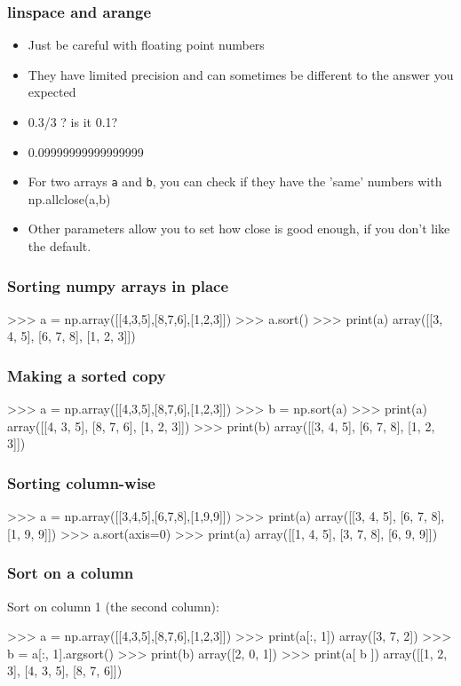 \documentclass{beamer}
\begin{document}
\begin{frame}[fragile]
\frametitle{linspace and arange}
\begin{itemize}
\item Just be careful with floating point numbers
\item They have limited precision and can sometimes be different to
  the answer you expected
\item 0.3/3 ? is it 0.1?
\item 0.09999999999999999
\item For two arrays \texttt{a} and \texttt{b}, you can check if they have the 'same'
  numbers with np.allclose(a,b)
\item Other parameters allow you to set how close is good enough, if
  you don't like the default.
\end{itemize}
\end{frame}


\begin{frame}[fragile]
\frametitle{Sorting numpy arrays in place}
\begin{code}
>>> a = np.array([[4,3,5],[8,7,6],[1,2,3]]) 
>>> a.sort()
>>> print(a)
array([[3, 4, 5],
       [6, 7, 8],
       [1, 2, 3]])
\end{code}
\end{frame}

\begin{frame}[fragile]
\frametitle{Making a sorted copy}
\begin{code}
>>> a = np.array([[4,3,5],[8,7,6],[1,2,3]])
>>> b = np.sort(a)
>>> print(a)
array([[4, 3, 5],
       [8, 7, 6],
       [1, 2, 3]])
>>> print(b)
array([[3, 4, 5],
       [6, 7, 8],
       [1, 2, 3]])
\end{code}
\end{frame}

\begin{frame}[fragile]
\frametitle{{Sorting column-wise}}
\begin{code}
>>> a = np.array([[3,4,5],[6,7,8],[1,9,9]])
>>> print(a)
array([[3, 4, 5],
       [6, 7, 8],
       [1, 9, 9]])
>>> a.sort(axis=0)
>>> print(a)
array([[1, 4, 5],
       [3, 7, 8],
       [6, 9, 9]])
\end{code}
\end{frame}

\begin{frame}[fragile]
\frametitle{{Sort on a column}}
Sort on column 1 (the second column):
\begin{code}
>>> a = np.array([[4,3,5],[8,7,6],[1,2,3]])
>>> print(a[:, 1])
array([3, 7, 2])
>>> b = a[:, 1].argsort()
>>> print(b)
array([2, 0, 1])
>>> print(a[ b ])
array([[1, 2, 3],
       [4, 3, 5],
       [8, 7, 6]])
\end{code}
\end{frame}
\end{document}
